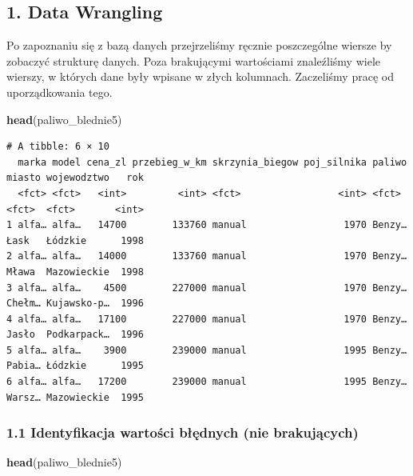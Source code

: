 \documentclass[
]{article}
\newenvironment{Shaded}{\begin{snugshade}}{\end{snugshade}}
\newcommand{\FunctionTok}[1]{\textcolor[rgb]{0.13,0.29,0.53}{\textbf{#1}}}
\newcommand{\NormalTok}[1]{#1}
\begin{document}
\subsection{1. Data Wrangling}\label{data-wrangling}

Po zapoznaniu się z bazą danych przejrzeliśmy ręcznie poszczególne
wiersze by zobaczyć strukturę danych. Poza brakującymi wartościami
znaleźliśmy wiele wierszy, w których dane były wpisane w złych
kolumnach. Zaczeliśmy pracę od uporządkowania tego.

\begin{Shaded}
\begin{Highlighting}[]
\FunctionTok{head}\NormalTok{(paliwo\_blednie5)}
\end{Highlighting}
\end{Shaded}

\begin{verbatim}
# A tibble: 6 × 10
  marka model cena_zl przebieg_w_km skrzynia_biegow poj_silnika paliwo miasto wojewodztwo   rok
  <fct> <fct>   <int>         <int> <fct>                 <int> <fct>  <fct>  <fct>       <int>
1 alfa… alfa…   14700        133760 manual                 1970 Benzy… Łask   Łódzkie      1998
2 alfa… alfa…   14000        133760 manual                 1970 Benzy… Mława  Mazowieckie  1998
3 alfa… alfa…    4500        227000 manual                 1970 Benzy… Chełm… Kujawsko-p…  1996
4 alfa… alfa…   17100        227000 manual                 1970 Benzy… Jasło  Podkarpack…  1996
5 alfa… alfa…    3900        239000 manual                 1995 Benzy… Pabia… Łódzkie      1995
6 alfa… alfa…   17200        239000 manual                 1995 Benzy… Warsz… Mazowieckie  1995
\end{verbatim}

\subsubsection{1.1 Identyfikacja wartości błędnych (nie
brakujących)}\label{identyfikacja-wartoux15bci-bux142ux119dnych-nie-brakujux105cych}

\begin{Shaded}
\begin{Highlighting}[]
\FunctionTok{head}\NormalTok{(paliwo\_blednie5)}
\end{Highlighting}
\end{Shaded}
\end{document}
